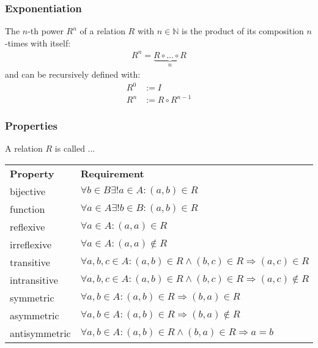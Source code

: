 \subsubsection{Exponentiation}
The $n$-th power $R^n$ of a relation $R$ with $n \in \mathbb{N}$ is the product of its composition $n$-times with itself:
\begin{align}
R^n = \underbrace{R \circ ... \circ R}_{n}
\end{align}
and can be recursively defined with:
\begin{align}
R^{0} &:= I
\\R^{n} &:= R \circ R^{n-1}
\end{align}

\subsubsection{Properties}
A relation $R$ is called ...
\begin{center}
\begin{tabular}{ll}
\textbf{Property} & \textbf{Requirement}\\
bijective & $\forall b \in B \exists! a \in A: (a,b) \in R$\\
function & $\forall a \in A \exists! b \in B: (a,b) \in R$\\
reflexive & $\forall a \in A: (a,a) \in R$\\
irreflexive & $\forall a \in A: (a,a) \not\in R$\\
transitive & $\forall a,b,c \in A: (a,b) \in R \wedge (b,c) \in R \Rightarrow (a,c) \in R$\\
intransitive & $\forall a,b,c \in A: (a,b) \in R \wedge (b,c) \in R \Rightarrow (a,c) \not\in R$\\
symmetric & $\forall a,b \in A: (a,b) \in R \Rightarrow (b,a) \in R$\\
asymmetric & $\forall a,b \in A: (a,b) \in R \Rightarrow (b,a) \not\in R$\\
antisymmetric & $\forall a,b \in A: (a,b) \in R \wedge (b,a) \in R \Rightarrow a = b$\\
\end{tabular}
\end{center}

